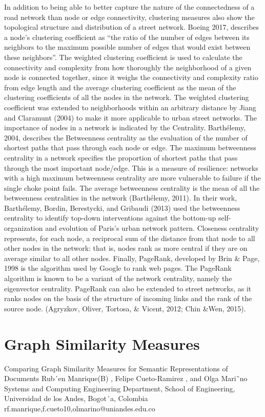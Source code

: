 In addition to being able to better capture the nature of the connectedness of a road network than node or edge connectivity, clustering measures also show the topological structure and distribution of a street network. Boeing 2017, describes a node’s clustering coefficient as “the ratio of the number of edges between its neighbors to the maximum possible number of edges that would exist between these neighbors”. The weighted clustering coefficient is used to calculate the connectivity and complexity from how thoroughly the neighborhood of a given node is connected together, since it weighs the connectivity and complexity ratio from edge length and the average clustering coefficient as the mean of the clustering coefficients of all the nodes in the network. The weighted clustering coefficient was extended to neighborhoods within an arbitrary distance by Jiang and Claramunt (2004) to make it more applicable to urban street networks. The importance of nodes in a network is indicated by the Centrality. Barthélemy, 2004, describes the Betweenness centrality as the evaluation of the number of shortest paths that pass through each node or edge. The maximum betweenness centrality in a network specifies the  proportion of shortest paths that pass through the most important node/edge. This is a measure of resilience: networks with a high maximum betweenness centrality are more vulnerable to failure if the single choke point fails. The average betweenness centrality is the mean of all the betweenness centralities in the network (Barthélemy, 2011). In their work, Barthélemy, Bordin, Berestycki, and Gribaudi (2013) used the betweenness centrality to identify top-down interventions against the bottom-up self-organization and evolution of Paris's urban network pattern. Closeness centrality represents, for each node, a reciprocal sum of the distance from that node to all other nodes in the network: that is, nodes rank as more central if they are on average similar to all other nodes. Finally, PageRank, developed by Brin & Page, 1998 is the algorithm used by Google to rank web pages. The PageRank algorithm is known to be a variant of the network centrality, namely the eigenvector centrality. PageRank can also be extended to street networks, as it ranks nodes on the basis of the structure of incoming links and the rank of the source node. (Agryzkov, Oliver, Tortosa, \& Vicent, 2012; Chin &Wen, 2015).

\section{Graph Similarity Measures}
Comparing Graph Similarity Measures for Semantic Representations of Documents Rub´en Manrique(B) , Felipe Cueto-Ramirez , and Olga Mari˜no Systems and Computing Engineering Department, School of Engineering, Universidad de los Andes, Bogot´a, Colombia {rf.manrique,f.cueto10,olmarino}@uniandes.edu.co

